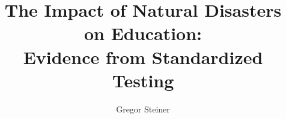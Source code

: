 \documentclass[11pt]{article}
\title{The Impact of Natural Disasters on Education: \\ Evidence from Standardized Testing}
\author{Gregor Steiner}
\begin{document}
\maketitle

\begin{abstract}
\end{abstract}















\end{document}
